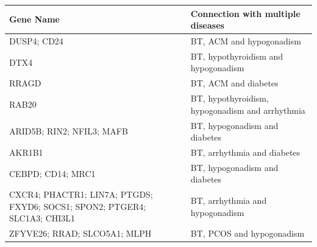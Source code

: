 \begin{table}[H]
    \centering
    \begin{tabular}{|p{3cm}|p{8cm}|}
        \hline
        Gene Name & Connection with multiple diseases \\
        \hline
        DUSP4; CD24 & BT, ACM and hypogonadism \\
        \hline
        DTX4 & BT, hypothyroidism and hypogonadism \\
        \hline
        RRAGD & BT, ACM and diabetes \\
        \hline
        RAB20 & BT, hypothyroidism, hypogonadism and arrhythmia \\
        \hline
        ARID5B; RIN2; NFIL3; MAFB & BT, hypogonadism and diabetes \\
        \hline
        AKR1B1 & BT, arrhythmia and diabetes \\
        \hline
        CEBPD; CD14; MRC1 & BT, hypogonadism and diabetes \\
        \hline
        CXCR4; PHACTR1; LIN7A; PTGDS; FXYD6; SOCS1; SPON2; PTGER4; SLC1A3; CHI3L1 & BT, arrhythmia and hypogonadism \\
        \hline
        ZFYVE26; RRAD; SLCO5A1; MLPH & BT, PCOS and hypogonadism \\
        \hline
    \end{tabular}
    
    \label{tab:significant_genes}
\end{table}

